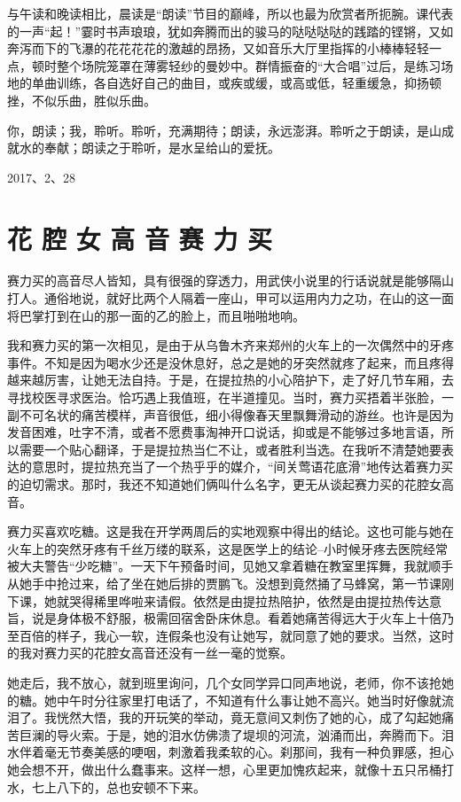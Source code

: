 \documentclass[openany]{ctexbook}
\begin{document}
与午读和晚读相比，晨读是``朗读''节目的巅峰，所以也最为欣赏者所扼腕。课代表的一声``起！''霎时书声琅琅，犹如奔腾而出的骏马的哒哒哒哒的践踏的铿锵，又如奔泻而下的飞瀑的花花花花的激越的昂扬，又如音乐大厅里指挥的小棒棒轻轻一点，顿时整个场院笼罩在薄雾轻纱的曼妙中。群情振奋的``大合唱''过后，是练习场地的单曲训练，各自选好自己的曲目，或疾或缓，或高或低，轻重缓急，抑扬顿挫，不似乐曲，胜似乐曲。

你，朗读；我，聆听。聆听，充满期待；朗读，永远澎湃。聆听之于朗读，是山成就水的奉献；朗读之于聆听，是水呈给山的爱抚。

2017、2、28

\chapter*{花 腔 女 高 音 赛 力 买}\label{sailimai}

赛力买的高音尽人皆知，具有很强的穿透力，用武侠小说里的行话说就是能够隔山打人。通俗地说，就好比两个人隔着一座山，甲可以运用内力之功，在山的这一面将巴掌打到在山的那一面的乙的脸上，而且啪啪地响。

我和赛力买的第一次相见，是由于从乌鲁木齐来郑州的火车上的一次偶然中的牙疼事件。不知是因为喝水少还是没休息好，总之是她的牙突然就疼了起来，而且疼得越来越厉害，让她无法自持。于是，在提拉热的小心陪护下，走了好几节车厢，去寻找校医寻求医治。恰巧遇上我值班，在半道撞见。当时，赛力买捂着半张脸，一副不可名状的痛苦模样，声音很低，细小得像春天里飘舞滑动的游丝。也许是因为发音困难，吐字不清，或者不愿费事淘神开口说话，抑或是不能够过多地言语，所以需要一个贴心翻译，于是提拉热当仁不让，或者胜利当选。在我听不清楚她要表达的意思时，提拉热充当了一个热乎乎的媒介，``间关莺语花底滑''地传达着赛力买的迫切需求。那时，我还不知道她们俩叫什么名字，更无从谈起赛力买的花腔女高音。

赛力买喜欢吃糖。这是我在开学两周后的实地观察中得出的结论。这也可能与她在火车上的突然牙疼有千丝万缕的联系，这是医学上的结论--小时候牙疼去医院经常被大夫警告``少吃糖''。一天下午预备时间，见她又拿着糖在教室里挥舞，我就顺手从她手中抢过来，给了坐在她后排的贾鹏飞。没想到竟然捅了马蜂窝，第一节课刚下课，她就哭得稀里哗啦来请假。依然是由提拉热陪护，依然是由提拉热传达意旨，说是身体极不舒服，极需回宿舍卧床休息。看着她痛苦得远大于火车上十倍乃至百倍的样子，我心一软，连假条也没有让她写，就同意了她的要求。当然，这时的我对赛力买的花腔女高音还没有一丝一毫的觉察。

她走后，我不放心，就到班里询问，几个女同学异口同声地说，老师，你不该抢她的糖。她中午时分往家里打电话了，不知道有什么事让她不高兴。她当时好像就流泪了。我恍然大悟，我的开玩笑的举动，竟无意间又刺伤了她的心，成了勾起她痛苦巨澜的导火索。于是，她的泪水仿佛溃了堤坝的河流，汹涌而出，奔腾而下。泪水伴着毫无节奏美感的哽咽，刺激着我柔软的心。刹那间，我有一种负罪感，担心她会想不开，做出什么蠢事来。这样一想，心里更加愧疚起来，就像十五只吊桶打水，七上八下的，总也安顿不下来。
\end{document}
